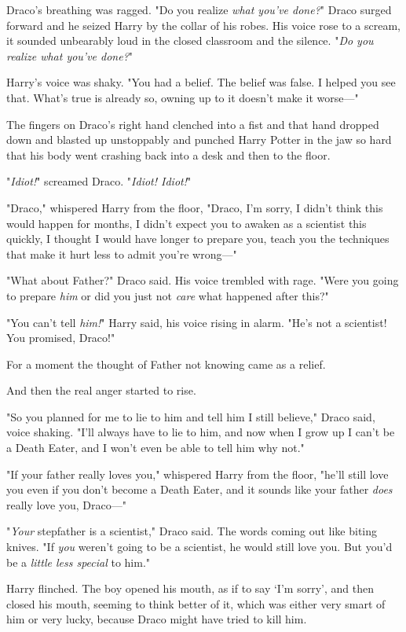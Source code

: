 Draco's breathing was ragged. "Do you realize \emph{what you've done?}" Draco
surged forward and he seized Harry by the collar of his robes. His voice rose
to a scream, it sounded unbearably loud in the closed classroom and the
silence. "\emph{Do you realize what you've done?}"

Harry's voice was shaky. "You had a belief. The belief was false. I helped you
see that. What's true is already so, owning up to it doesn't make it worse---"

The fingers on Draco's right hand clenched into a fist and that hand dropped
down and blasted up unstoppably and punched Harry Potter in the jaw so hard
that his body went crashing back into a desk and then to the floor.

"\emph{Idiot!}" screamed Draco. "\emph{Idiot! Idiot!}"

"Draco," whispered Harry from the floor, "Draco, I'm sorry, I didn't think this
would happen for months, I didn't expect you to awaken as a scientist this
quickly, I thought I would have longer to prepare you, teach you the techniques
that make it hurt less to admit you're wrong---"

"What about Father?" Draco said. His voice trembled with rage. "Were you going
to prepare \emph{him} or did you just not \emph{care} what happened after this?"

"You can't tell \emph{him!}" Harry said, his voice rising in alarm. "He's not a
scientist! You promised, Draco!"

For a moment the thought of Father not knowing came as a relief.

And then the real anger started to rise.

"So you planned for me to lie to him and tell him I still believe," Draco said,
voice shaking. "I'll always have to lie to him, and now when I grow up I can't
be a Death Eater, and I won't even be able to tell him why not."

"If your father really loves you," whispered Harry from the floor, "he'll still
love you even if you don't become a Death Eater, and it sounds like your father
\emph{does} really love you, Draco---"

"\emph{Your} stepfather is a scientist," Draco said. The words coming out like
biting knives. "If \emph{you} weren't going to be a scientist, he would still
love you. But you'd be a \emph{little less special} to him."

Harry flinched. The boy opened his mouth, as if to say `I'm sorry', and then
closed his mouth, seeming to think better of it, which was either very smart of
him or very lucky, because Draco might have tried to kill him.

